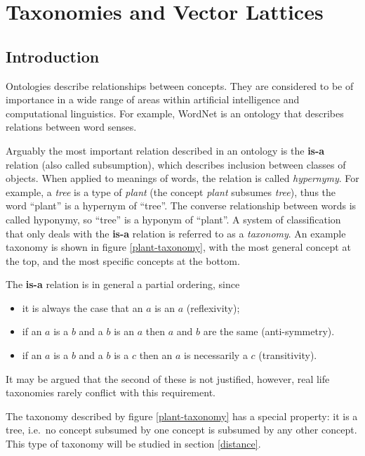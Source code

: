  
% 

% 
 
 \chapter{Taxonomies and Vector Lattices}
 

 \section{Introduction}

Ontologies describe relationships between concepts. They are considered to be of importance in a wide range of areas within artificial intelligence and computational linguistics. For example, WordNet \citep{Fellbaum:98} is an ontology that describes relations between word senses.

Arguably the most important relation described in an ontology is the \textbf{is-a} relation (also called subsumption), which describes inclusion between classes of objects.  When applied to meanings of words, the relation is called \emph{hypernymy}. For example, a \emph{tree} is a type of \emph{plant} (the concept \emph{plant} subsumes \emph{tree}), thus the word ``plant'' is a hypernym of ``tree''. The converse relationship between words is called hyponymy, so ``tree'' is a hyponym of ``plant''. A system of classification that only deals with the \textbf{is-a} relation is referred to as a \emph{taxonomy}. An example taxonomy is shown in figure \ref{plant-taxonomy}, with the most general concept at the top, and the most specific concepts at the bottom.

The \textbf{is-a} relation is in general a partial ordering, since
\begin{itemize}
\item it is always the case that an $a$ is an $a$ (reflexivity);
\item if an $a$ is a $b$ and a $b$ is an $a$ then $a$ and $b$ are the same (anti-symmetry).
\item if an $a$ is a $b$ and a $b$ is a $c$ then an $a$ is necessarily a $c$ (transitivity).
\end{itemize}
It may be argued that the second of these is not justified, however, real life taxonomies rarely conflict with this requirement.

The taxonomy described by figure \ref{plant-taxonomy} has a special property: it is a tree, i.e.~no concept subsumed by one concept is subsumed by any other concept. This type of taxonomy will be studied in section \ref{distance}.

